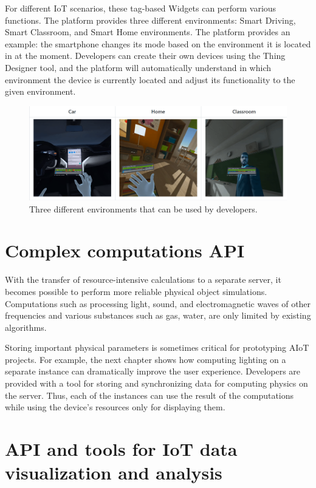 For different IoT scenarios, these tag-based Widgets can perform various functions. The platform provides three different environments: Smart Driving, Smart Classroom, and Smart Home environments. The platform provides an example: the smartphone changes its mode based on the environment it is located in at the moment. Developers can create their own devices using the Thing Designer tool, and the platform will automatically understand in which environment the device is currently located and adjust its functionality to the given environment. 

\begin{figure}
  \centering
  \includegraphics[width=0.9\linewidth]{figures/Environments.png}
  \caption{Three different environments that can be used by developers.}
  \label{fig:Environments-figure}
\end{figure}

\section{Complex computations API}

With the transfer of resource-intensive calculations to a separate server, it becomes possible to perform more reliable physical object simulations. Computations such as processing light, sound, and electromagnetic waves of other frequencies and various substances such as gas, water, are only limited by existing algorithms. 

Storing important physical parameters is sometimes critical for prototyping AIoT projects. For example, the next chapter shows how computing lighting on a separate instance can dramatically improve the user experience. Developers are provided with a tool for storing and synchronizing data for computing physics on the server. Thus, each of the instances can use the result of the computations while using the device's resources only for displaying them. 

\section{API and tools for IoT data visualization and analysis}

